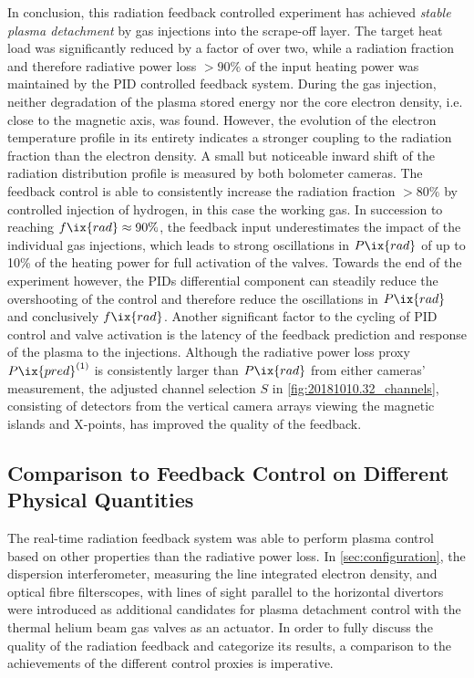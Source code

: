             In conclusion, this radiation feedback controlled experiment has achieved \textit{stable plasma detachment} by gas injections into the scrape-off layer. The target heat load was significantly reduced by a factor of over two, while a radiation fraction and therefore radiative power loss $>90\%$ of the input heating power was maintained by the PID controlled feedback system. During the gas injection, neither degradation of the plasma stored energy nor the core electron density, i.e. close to the magnetic axis, was found. However, the evolution of the electron temperature profile in its entirety indicates a stronger coupling to the radiation fraction than the electron density. A small but noticeable inward shift of the radiation distribution profile is measured by both bolometer cameras. The feedback control is able to consistently increase the radiation fraction $>80\%$ by controlled injection of hydrogen, in this case the working gas. In succession to reaching $f\ix{rad}\approx90\%$, the feedback input underestimates the impact of the individual gas injections, which leads to strong oscillations in $P\ix{rad}$ of up to 10\% of the heating power for full activation of the valves. Towards the end of the experiment however, the PIDs differential component can steadily reduce the overshooting of the control and therefore reduce the oscillations in $P\ix{rad}$ and conclusively $f\ix{rad}$. Another significant factor to the cycling of PID control and valve activation is the latency of the feedback prediction and response of the plasma to the injections. Although the radiative power loss proxy $P\ix{pred}^{\left(1\right)}$ is consistently larger than $P\ix{rad}$ from either cameras' measurement, the adjusted channel selection $S$ in \cref{fig:20181010.32_channels}, consisting of detectors from the vertical camera arrays viewing the magnetic islands and X-points, has improved the quality of the feedback.%
%
        \subsection{Comparison to Feedback Control on Different Physical Quantities}\label{subsec:densityfeedback}%
%
            The real-time radiation feedback system was able to perform plasma control based on other properties than the radiative power loss. In \cref{sec:configuration}, the dispersion interferometer, measuring the line integrated electron density, and optical fibre filterscopes, with lines of sight parallel to the horizontal divertors were introduced as additional candidates for plasma detachment control with the thermal helium beam gas valves as an actuator. In order to fully discuss the quality of the radiation feedback and categorize its results, a comparison to the achievements of the different control proxies is imperative.%
%
